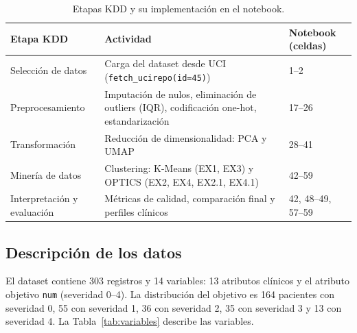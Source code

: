 \documentclass[11pt,a4paper]{article}
\begin{document}
\begin{table}[H]
  \centering
  \caption{Etapas KDD y su implementación en el notebook.}
  \label{tab:kdd}
  \small
  \begin{tabular}{@{}p{3.6cm}p{6.4cm}p{4.2cm}@{}}
    \toprule
    \textbf{Etapa KDD} & \textbf{Actividad} & \textbf{Notebook (celdas)} \\
    \midrule
    Selección de datos & Carga del dataset desde UCI (\texttt{fetch\_ucirepo(id=45)}) & 1--2 \\
    Preprocesamiento & Imputación de nulos, eliminación de outliers (IQR), codificación one-hot, estandarización & 17--26 \\
    Transformación & Reducción de dimensionalidad: PCA y UMAP & 28--41 \\
    Minería de datos & Clustering: K-Means (EX1, EX3) y OPTICS (EX2, EX4, EX2.1, EX4.1) & 42--59 \\
    Interpretación y evaluación & Métricas de calidad, comparación final y perfiles clínicos & 42, 48--49, 57--59 \\
    \bottomrule
  \end{tabular}
\end{table}

\subsection{Descripción de los datos}

El dataset contiene 303 registros y 14 variables: 13 atributos clínicos y el atributo
objetivo \texttt{num} (severidad 0--4). La distribución del objetivo es 164 pacientes con
severidad 0, 55 con severidad 1, 36 con severidad 2, 35 con severidad 3 y 13 con severidad 4.
La Tabla~\ref{tab:variables} describe las variables.
\end{document}
